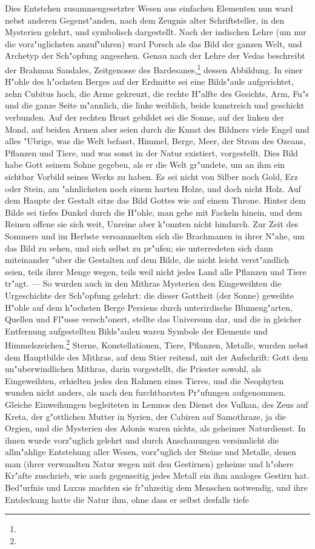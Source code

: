 \documentclass[a4paper, 11pt, oneside, polutonikogreek, german]{article}
\begin{document}
Dies Entstehen zusammengesetzter Wesen aus einfachen Elementen nun ward nebst anderen Gegenst"anden, nach dem Zeugnis alter Schriftsteller, in den Mysterien gelehrt, und symbolisch dargestellt. Nach der indischen Lehre (um nur die vorz"uglichsten anzuf"uhren) ward Porsch als das Bild der ganzen Welt, und Archetyp der Sch"opfung angesehen. Genau nach der Lehre der Vedas beschreibt der Brahman Sandales, Zeitgenosse des Bardesanes,\footnote{} dessen Abbildung. In einer H"ohle des h"ochsten Berges auf der Erdmitte sei eine Bilds"aule aufgerichtet, zehn Cubitus hoch, die Arme gekreuzt, die rechte H"alfte des Gesichts, Arm, Fu"s und die ganze Seite m"annlich, die linke weiblich, beide kunstreich und geschickt verbunden. Auf der rechten Brust gebildet sei die Sonne, auf der linken der Mond, auf beiden Armen aber seien durch die Kunst des Bildners viele Engel und alles "Ubrige, was die Welt befasst, Himmel, Berge, Meer, der Strom des Ozeans, Pflanzen und Tiere, und was sonst in der Natur existiert, vorgestellt. Dies Bild habe Gott seinem Sohne gegeben, als er die Welt gr"undete, um an ihm ein sichtbar Vorbild seines Werks zu haben. Es sei nicht von Silber noch Gold, Erz oder Stein, am "ahnlichsten noch einem harten Holze, und doch nicht Holz. Auf dem Haupte der Gestalt sitze das Bild Gottes wie auf einem Throne. Hinter dem Bilde sei tiefes Dunkel durch die H"ohle, man gehe mit Fackeln hinein, und dem Reinen offene sie sich weit, Unreine aber k"onnten nicht hindurch. Zur Zeit des Sommers und im Herbste versammelten sich die Brachmanen in ihrer N"ahe, um das Bild zu sehen, und sich selbst zu pr"ufen; sie unterredeten sich dann miteinander "uber die Gestalten auf dem Bilde, die nicht leicht verst"andlich seien, teils ihrer Menge wegen, teils weil nicht jedes Land alle Pflanzen und Tiere tr"agt. --- So wurden auch in den Mithras Mysterien den Eingeweihten die Urgeschichte der Sch"opfung gelehrt: die dieser Gottheit (der Sonne) geweihte H"ohle auf dem h"ochsten Berge Persiens durch unterirdische Blumeng"arten, Quellen und Fl"usse versch"onert, stellte das Universum dar, und die in gleicher Entfernung aufgestellten Bilds"aulen waren Symbole der Elemente und Himmelszeichen.\footnote{} Sterne, Konstellationen, Tiere, Pflanzen, Metalle, wurden nebst dem Hauptbilde des Mithras, auf dem Stier reitend, mit der Aufschrift: Gott dem un"uberwindlichen Mithras, darin vorgestellt, die Priester sowohl, als Eingeweihten, erhielten jedes den Rahmen eines Tieres, und die Neophyten wunden nicht anders, als nach den furchtbarsten Pr"ufungen aufgenommen. Gleiche Einweihungen begleiteten in Lemnos den Dienst des Vulkan, des Zeus auf Kreta, der g"ottlichen Mutter in Syrien, der Cabiren auf Samothraze, ja die Orgien, und die Mysterien des Adonis waren nichts, als geheimer Naturdienst. In ihnen wurde vorz"uglich gelehrt und durch Anschauungen versinnlicht die allm"ahlige Entstehung aller Wesen, vorz"uglich der Steine und Metalle, denen man (ihrer verwandten Natur wegen mit den Gestirnen) geheime und h"ohere Kr"afte zuschrieb, wie auch gegenseitig jedes Metall ein ihm analoges Gestirn hat. Bed"urfnis und Luxus machten sie fr"uhzeitig dem Menschen notwendig, und ihre Entdeckung hatte die Natur ihm, ohne dass er selbst desfalls tiefe 
\end{document}
